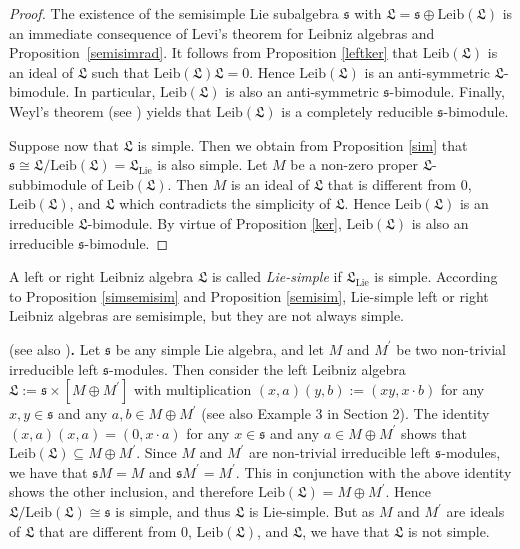 \documentclass{amsart}
\numberwithin{equation}{section}
\newcommand{\lie}{\mathrm{Lie}}
\newcommand{\leib}{\mathrm{Leib}}
\newcommand{\ssf}{\mathfrak{s}}
\newcommand{\lf}{\mathfrak{L}}
\begin{document}
\begin{proof}
The existence of the semisimple Lie subalgebra $\ssf$ with $\lf=\ssf\oplus\leib(\lf)$ is an immediate
consequence of Levi's theorem for Leibniz algebras and Proposition~\ref{semisimrad}. It follows
from Proposition \ref{leftker} that $\leib(\lf)$ is an ideal of $\lf$ such that $\leib(\lf)\lf=0$. Hence
$\leib(\lf)$ is an anti-symmetric $\lf$-bimodule. In particular, $\leib(\lf)$ is also an anti-symmetric
$\ssf$-bimodule. Finally, Weyl's theorem (see \cite[Theorem 6.3]{H}) yields that $\leib(\lf)$ is a
completely reducible $\ssf$-bimodule.

Suppose now that $\lf$ is simple. Then we obtain from Proposition \ref{sim} that $\ssf\cong\lf
/\leib(\lf)=\lf_\lie$ is also simple. Let $M$ be a non-zero proper $\lf$-subbimodule of $\leib(\lf)$.
Then $M$ is an ideal of $\lf$ that is different from $0$, $\leib(\lf)$, and $\lf$ which contradicts
the simplicity of $\lf$. Hence $\leib(\lf)$ is an irreducible $\lf$-bimodule. By virtue of Proposition
\ref{ker}, $\leib(\lf)$ is also an irreducible $\ssf$-bimodule.
\end{proof}

A left or right Leibniz algebra $\lf$ is called {\em Lie-simple\/} if $\lf_\lie$ is simple. According to
Proposition \ref{simsemisim} and Proposition \ref{semisim}, Lie-simple left or right Leibniz algebras
are semisimple, but they are not always simple.
\vspace{.2cm}

 (see also \cite[Example 5.3]{DMS1}){\bf .} Let $\ssf$ be any simple
Lie algebra, and let $M$ and $M^\prime$ be two non-trivial irreducible left $\ssf$-modules.
Then consider the left Leibniz algebra $\lf:=\ssf\times[M\oplus M^\prime]$ with multiplication
$(x,a)(y,b):=(xy,x\cdot b)$ for any $x,y\in\ssf$ and any $a,b\in M\oplus M^\prime$ (see also
Example 3 in Section 2). The identity $(x,a)(x,a)=(0,x\cdot a)$ for any $x\in\ssf$ and any
$a\in M\oplus M^\prime$ shows that $\leib(\lf)\subseteq M\oplus M^\prime$. Since $M$ and
$M^\prime$ are non-trivial irreducible left $\ssf$-modules, we have that $\ssf M=M$ and
$\ssf M^\prime=M^\prime$. This in conjunction with the above identity shows the other
inclusion, and therefore $\leib(\lf)=M\oplus M^\prime$. Hence $\lf/\leib(\lf)\cong\ssf$ is
simple, and thus $\lf$ is Lie-simple. But as $M$ and $M^\prime$ are ideals of $\lf$ that are
different from $0$, $\leib(\lf)$, and $\lf$, we have that $\lf$ is not simple.
\vspace{.2cm}
\end{document}
